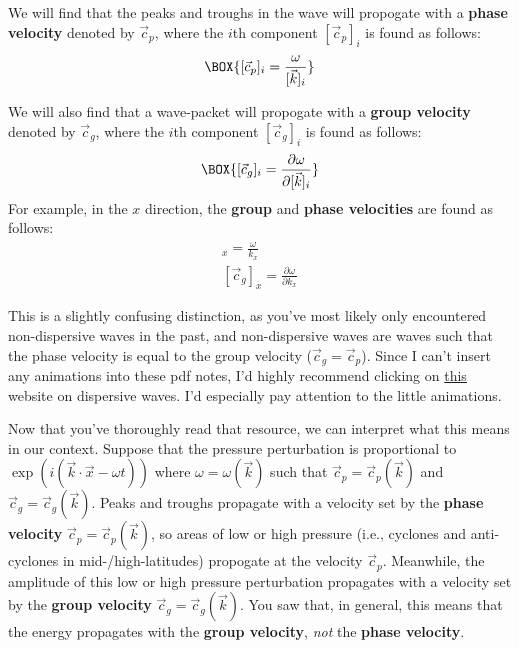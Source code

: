 We will find that the peaks and troughs in the wave will propogate with a \textbf{phase velocity} denoted by $\vec{c}_p$, where the $i$th component $[\vec{c}_p]_i$ is found as follows:
\begin{align}
    \label{Phase Velocity}
    \BOX{[\vec{c}_p]_i=\frac{\omega}{[\vec{k}]_i}}
\end{align}

We will also find that a wave-packet will propogate with a \textbf{group velocity} denoted by $\vec{c}_g$, where the $i$th component $[\vec{c}_g]_i$ is found as follows:
\begin{align}
    \label{Group Velocity}
    \BOX{[\vec{c}_g]_i=\frac{\partial\omega}{\partial [\vec{k}]_i}}
\end{align}
For example, in the $x$ direction, the \textbf{group} and \textbf{phase velocities} are found as follows:
\begin{align*}
    [\vec{c}_p]_x=\frac{\omega}{k_x}\\
    [\vec{c}_g]_x=\frac{\partial\omega}{\partial k_x}
\end{align*}

This is a slightly confusing distinction, as you've most likely only encountered non-dispersive waves in the past, and non-dispersive waves are waves such that the phase velocity is equal to the group velocity ($\vec{c}_g=\vec{c}_p$). Since I can't insert any animations into these pdf notes, I'd highly recommend clicking on \href{https://resource.isvr.soton.ac.uk/spcg/tutorial/tutorial/Tutorial_files/Web-further-dispersive.htm}{this} website on dispersive waves. I'd especially pay attention to the little animations.

Now that you've thoroughly read that resource, we can interpret what this means in our context. Suppose that the pressure perturbation is proportional to $\exp(i(\vec{k}\cdot\vec{x}-\omega t))$ where $\omega=\omega(\vec{k})$ such that $\vec{c}_p=\vec{c}_p(\vec{k})$ and $\vec{c}_g=\vec{c}_g(\vec{k})$. Peaks and troughs propagate with a velocity set by the \textbf{phase velocity} $\vec{c}_p=\vec{c}_p(\vec{k})$, so areas of low or high pressure (i.e., cyclones and anti-cyclones in mid-/high-latitudes) propogate at the velocity $\vec{c}_p$. Meanwhile, the amplitude of this low or high pressure perturbation propagates with a velocity set by the \textbf{group velocity} $\vec{c}_g=\vec{c}_g(\vec{k})$. You saw that, in general, this means that the energy propagates with the \textbf{group velocity}, \textit{not} the \textbf{phase velocity}.


